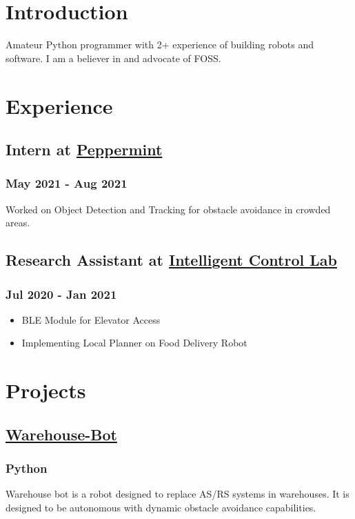 \documentclass[letterpaper]{article}
\author{Sudhanv Apte}
\date{\today}
\title{}
\begin{document}


\section{Introduction}
\label{sec:org649140c}
Amateur Python programmer with 2+ experience of building robots and software. I am a believer in
and advocate of FOSS.

\section{Experience}
\label{sec:org9c57ffd}
\subsection{Intern at \href{http://getpeppermint.co}{Peppermint}}
\label{sec:org7821b10}
\subsubsection{May 2021 - Aug 2021}
\label{sec:org167ec72}
Worked on Object Detection and Tracking for obstacle avoidance in crowded areas.
\subsection{Research Assistant at \href{https://itlab.ee.ntut.edu.tw/}{Intelligent Control Lab}}
\label{sec:org3cc544f}
\subsubsection{Jul 2020 - Jan 2021}
\label{sec:orga7f97a0}
\begin{itemize}
\item BLE Module for Elevator Access
\item Implementing Local Planner on Food Delivery Robot
\end{itemize}

\section{Projects}
\label{sec:org2d9928b}
\subsection{\href{https://github.com/sudhanv09/Warehouse-Bot}{Warehouse-Bot}}
\label{sec:orgcffc4ec}
\subsubsection{Python}
\label{sec:org9ebd406}
Warehouse bot is a robot designed to replace AS/RS systems in warehouses. It is
designed to be autonomous with dynamic obstacle avoidance capabilities.
\end{document}
